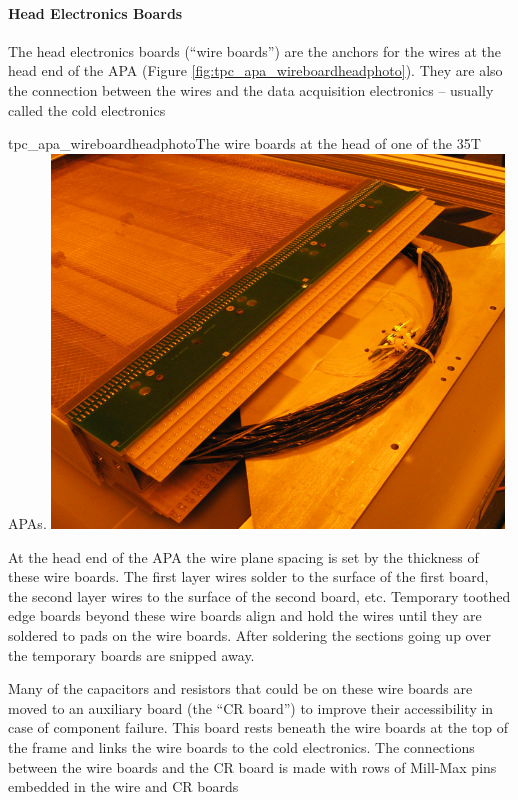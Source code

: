 \paragraph{Head Electronics Boards}

The head electronics boards (``wire boards'') are the anchors for the wires at the head end of the APA (Figure \ref{fig:tpc_apa_wireboardheadphoto}).  They are also the connection between the wires and the data acquisition electronics -- usually called the cold electronics

\begin{cdrfigure}{tpc_apa_wireboardheadphoto}{The wire boards at the head of one of the 35T APAs.}
\includegraphics[width=0.9\textwidth]{figures/tpc_apa_wireboardheadphoto.png} 
\end{cdrfigure}

At the head end of the APA the wire plane spacing is set by the thickness of these wire boards.  The first layer wires solder to the surface of the first board, the second layer wires to the surface of the second board, etc.  Temporary toothed edge boards beyond these wire boards align and hold the wires until they are soldered to pads on the wire boards.  After soldering the sections going up over the temporary boards are snipped away.

Many of the capacitors and resistors that could be on these wire boards are moved to an auxiliary board (the ``CR board'') to improve their accessibility in case of component failure.  This board rests beneath the wire boards at the top of the frame and links the wire boards to the cold electronics.  The connections between the wire boards and the CR board is made with rows of Mill-Max pins embedded in the wire and CR boards

